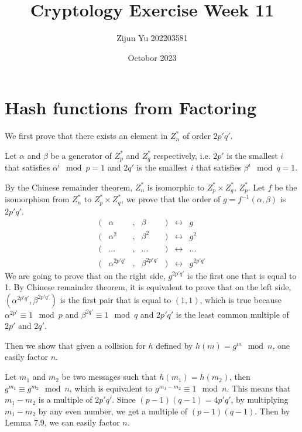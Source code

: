 \documentclass{article}
\title{Cryptology Exercise Week 11}
\author{Zijun Yu 202203581}
\date{Octobor 2023}
\begin{document}
\maketitle

\section*{Hash functions from Factoring}


We first prove that there exists an element in $Z_n^*$ of order $2p'q'$.

Let $\alpha$ and $\beta$ be a generator of $Z_p^*$ and $Z_q^*$ respectively, i.e.
$2p'$ is the smallest $i$ that satisfies $\alpha^i \mod p = 1$ and
$2q'$ is the smallest $i$ that satisfies $\beta^i \mod q = 1$.

By the Chinese remainder theorem, $Z_n^*$ is isomorphic to $Z_p^* \times Z_q^*$, $Z_p^*$.
Let $f$ be the isomorphism from $Z_n^*$ to $Z_p^* \times Z_q^*$, we prove that
the order of $g = f^{-1}(\alpha, \beta)$ is $2p'q'$.
\[
\begin{matrix}
    (&\alpha &, & \beta & ) & \leftrightarrow & g \\
    (&\alpha^2 &, & \beta^2 & ) & \leftrightarrow & g^2 \\
    (& ... &, & ... &)& \leftrightarrow & ...\\
    (& \alpha^{2p'q'} &,& \beta^{2p'q'} & )& \leftrightarrow & g^{2p'q'}
\end{matrix}
\]
We are going to prove that on the right side, $g^{2p'q'}$ is the first one that is equal to 1.
By Chinese remainder theorem, it is equivalent to prove that on the left side,
$(\alpha^{2p'q'}, \beta^{2p'q'})$ is the first pair that is equal to $(1, 1)$, which is true
because $\alpha^{2p'} \equiv 1 \mod p$ and $\beta^{2q'} \equiv 1 \mod q$ and $2p'q'$ is the least common multiple of $2p'$ and $2q'$.

Then we show that given a collision for $h$ defined by $h(m) = g^m \mod n$, one easily factor $n$.

Let $m_1$ and $m_2$ be two messages such that $h(m_1) = h(m_2)$, then
$g^{m_1} \equiv g^{m_2} \mod n$, which is equivalent to
$g^{m_1 - m_2} \equiv 1 \mod n$. This means that $m_1 - m_2$ is a multiple of $2p'q'$.
Since $(p-1)(q-1) = 4p'q'$, by multiplying $m_1 - m_2$ by any even number, we get a multiple of
$(p-1)(q-1)$. Then by Lemma 7.9, we can easily factor $n$.
\end{document}
